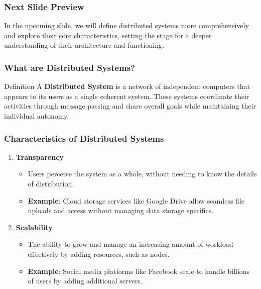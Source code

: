 \documentclass[aspectratio=169]{beamer}
\begin{document}
\begin{frame}[fragile]
    \frametitle{Next Slide Preview}
    In the upcoming slide, we will define distributed systems more comprehensively and explore their core characteristics, setting the stage for a deeper understanding of their architecture and functioning.
\end{frame}

\begin{frame}[fragile]
    \frametitle{What are Distributed Systems?}
    \begin{block}{Definition}
        A \textbf{Distributed System} is a network of independent computers that appears to its users as a single coherent system. These systems coordinate their activities through message passing and share overall goals while maintaining their individual autonomy.
    \end{block}
\end{frame}

\begin{frame}[fragile]
    \frametitle{Characteristics of Distributed Systems}
    \begin{enumerate}
        \item \textbf{Transparency}
            \begin{itemize}
                \item Users perceive the system as a whole, without needing to know the details of distribution.
                \item \textbf{Example}: Cloud storage services like Google Drive allow seamless file uploads and access without managing data storage specifics.
            \end{itemize}
            
        \item \textbf{Scalability}
            \begin{itemize}
                \item The ability to grow and manage an increasing amount of workload effectively by adding resources, such as nodes.
                \item \textbf{Example}: Social media platforms like Facebook scale to handle billions of users by adding additional servers.
            \end{itemize}
    \end{enumerate}
\end{frame}
\end{document}
